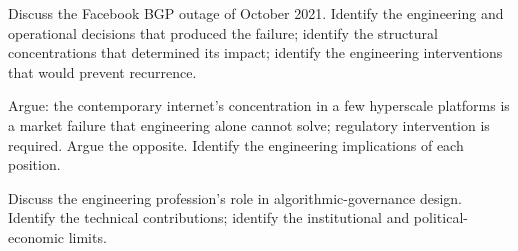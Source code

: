 \begin{exercise}
Discuss the Facebook BGP outage of October 2021. Identify the engineering and operational decisions that produced the failure; identify the structural concentrations that determined its impact; identify the engineering interventions that would prevent recurrence.
\end{exercise}

\begin{exercise}
Argue: the contemporary internet's concentration in a few hyperscale platforms is a market failure that engineering alone cannot solve; regulatory intervention is required. Argue the opposite. Identify the engineering implications of each position.
\end{exercise}

\begin{exercise}
Discuss the engineering profession's role in algorithmic-governance design. Identify the technical contributions; identify the institutional and political-economic limits.
\end{exercise}
